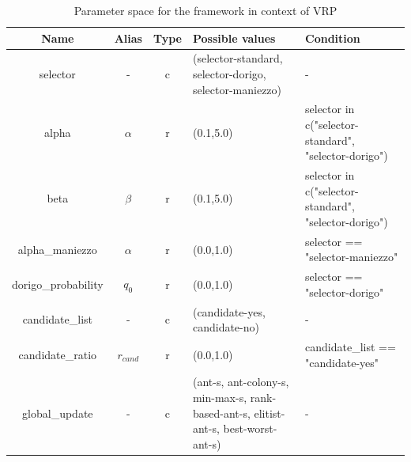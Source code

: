 \documentclass[12pt,a4paper,oneside]{book}
\begin{document}
\begin{table}[]
\centering
\caption{Parameter space for the framework in context of VRP}
\label{tbl:space}
\begin{tabular}{|c|c|c|p{4cm}|p{4cm}|}
\hline
\textbf{Name}  & \textbf{Alias}      & \textbf{Type} & \textbf{Possible values}                                                                & \textbf{Condition}                                                                                     \\ \hline
selector                        & -          & c    & (selector-standard, selector-dorigo, selector-maniezzo)                          & -                                                                                             \\ \hline
alpha                           & $\alpha$   & r    & (0.1,5.0)                                                                      & selector in c("selector-standard", "selector-dorigo")                                          \\ \hline
beta                            & $\beta$    & r    & (0.1,5.0)                                                                      & selector in c("selector-standard", "selector-dorigo")                                          \\ \hline
alpha\_maniezzo                 & $\alpha$   & r    & (0.0,1.0)                                                                      & selector == "selector-maniezzo"                                                               \\ \hline
dorigo\_probability             & $q_0$      & r    & (0.0,1.0)                                                                      & selector == "selector-dorigo"                                                                 \\ \hline
candidate\_list                 & -          & c    & (candidate-yes, candidate-no)                                                   & -                                                                                             \\ \hline
candidate\_ratio                & $r_{cand}$ & r    & (0.0,1.0)                                                                      & candidate\_list == "candidate-yes"                                                            \\ \hline
global\_update                  & -          & c    & (ant-s, ant-colony-s, min-max-s, rank-based-ant-s, elitist-ant-s, best-worst-ant-s) & -                                                                                             \\ \hline

\end{tabular}
\end{table}
\end{document}

